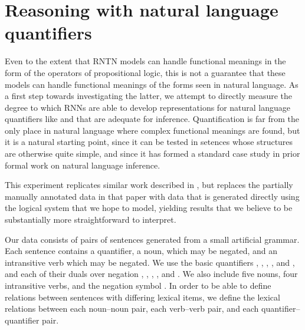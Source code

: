 \section{Reasoning with natural language quantifiers}

Even to the extent that RNTN models can handle functional meanings in the form of the operators of propositional logic, this is not a guarantee that these models can handle functional meanings of the forms seen in natural language. As a first step towards investigating the latter, we attempt to directly measure the degree to which RNNs are able to develop representations for natural language quantifiers like  and  that are adequate for inference. Quantification is far from the only place in natural language where complex functional meanings are found, but it is a natural starting point, since it can be tested in setences whose structures are otherwise quite simple, and since it has formed a standard case study in prior formal work on natural language inference.


This experiment replicates similar work described in \citet{bowman2013can}, but replaces the partially manually annotated data in that paper with data that is generated directly using the logical system that we hope to model, yielding results that we believe to be substantially more straightforward to interpret.

Our data consists of pairs of sentences generated from a small artificial grammar. Each sentence contains a quantifier, a noun, which may be negated, and an intransitive verb which may be negated. We use the basic quantifiers , , , , and , and each of their duals over negation , , , , and . We also include five nouns, four intransitive verbs, and the negation symbol . In order to be able to define relations between sentences with differing lexical items, we define the lexical relations between each noun--noun pair, each verb--verb pair, and each quantifier--quantifier pair.


